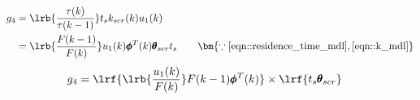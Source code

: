 \begin{align*}
        g_4 &= \lrb{\frac{\tau(k)}{\tau(k-1)}}
                t_s k_{scr}(k) u_1(k)\\
                &= \lrb{\frac{F(k-1)}{F(k)}} u_1(k) \pmb \phi^T(k) \pmb \theta_{scr} t_s
                \qquad \bm{\because \ref{eqn::residence_time_mdl}, \ref{eqn::k_mdl}}
\end{align*}
\begin{align}
        g_4 &= \lrf{\lrb{\frac{u_1(k)}{F(k)}} F(k-1) \pmb \phi^T(k)}
                \times \lrf{ t_s \pmb \theta_{scr} }
\end{align}
